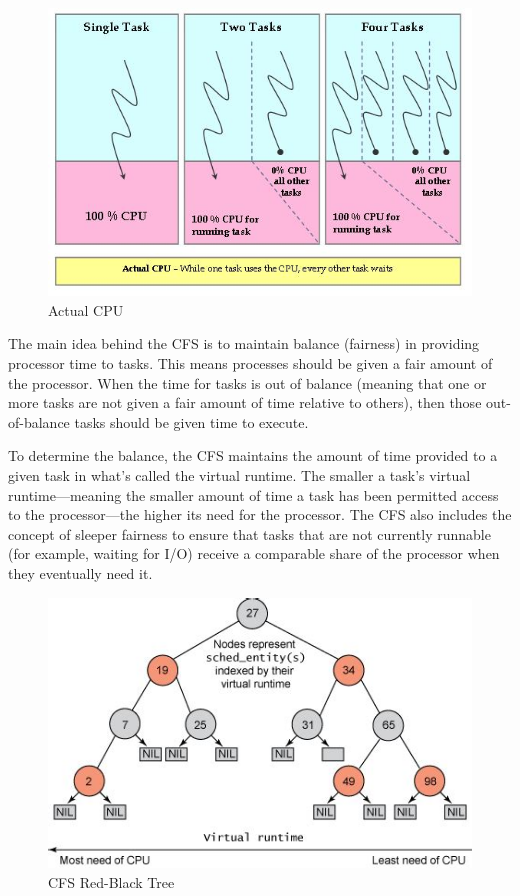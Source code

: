 \documentclass{article}
\begin{document}
\begin{figure}[H]
  \center
  \includegraphics[width=0.7\columnwidth]{./pics/cpu1.jpg}
  \caption{Actual CPU}
  \label{fig:Actual CPU}
\end{figure}

The main idea behind the CFS is to maintain balance (fairness) in providing processor time to tasks. This means processes should be given a fair amount of the processor. When the time for tasks is out of balance (meaning that one or more tasks are not given a fair amount of time relative to others), then those out-of-balance tasks should be given time to execute.

To determine the balance, the CFS maintains the amount of time provided to a given task in what's called the virtual runtime. The smaller a task's virtual runtime—meaning the smaller amount of time a task has been permitted access to the processor—the higher its need for the processor. The CFS also includes the concept of sleeper fairness to ensure that tasks that are not currently runnable (for example, waiting for I/O) receive a comparable share of the processor when they eventually need it.

\begin{figure}[H]
  \includegraphics[width=\linewidth]{./pics/rbtsched.jpg}
  \caption{CFS Red-Black Tree}
  \label{fig:CFS Red-Black Tree}
\end{figure}
\end{document}
